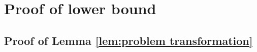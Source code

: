 \section{Proof of lower bound}

\subsection{Proof of Lemma \ref{lem:problem transformation}}
\label{subsection: proof of lemma problem transformation}





